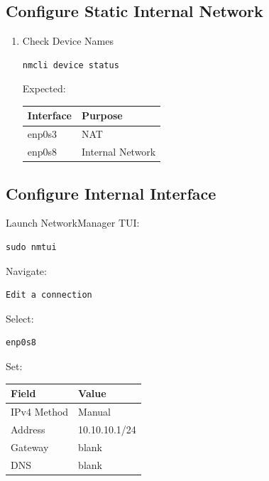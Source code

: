 \documentclass[11pt]{article}
\begin{document}
\subsection{Configure Static Internal Network}
\label{sec:org7381602}
\begin{enumerate}
\item Check Device Names
\label{sec:orge2355dd}

\begin{verbatim}
nmcli device status
\end{verbatim}

Expected:

\begin{center}
\begin{tabular}{ll}
Interface & Purpose\\
\hline
enp0s3 & NAT\\
enp0s8 & Internal Network\\
\end{tabular}
\end{center}
\end{enumerate}
\subsection{Configure Internal Interface}
\label{sec:org48c4804}

Launch NetworkManager TUI:

\begin{verbatim}
sudo nmtui
\end{verbatim}

Navigate:

\begin{verbatim}
Edit a connection
\end{verbatim}

Select:

\begin{verbatim}
enp0s8
\end{verbatim}

Set:

\begin{center}
\begin{tabular}{ll}
Field & Value\\
\hline
IPv4 Method & Manual\\
Address & 10.10.10.1/24\\
Gateway & blank\\
DNS & blank\\
\end{tabular}
\end{center}
\end{document}
